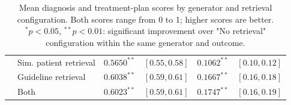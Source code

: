 \begin{table}[!b]
\begin{tabular*}{\textwidth}{@{\extracolsep{\fill}}lllclc@{}}
 & Sim. patient retrieval & $0.5650^{**}$ & {\scriptsize $[0.55, 0.58]$} & $0.1062^{**}$ & {\scriptsize $[0.10, 0.12]$} \\
 & Guideline retrieval & $\mathbf{0.6038}^{**}$ & {\scriptsize $[0.59, 0.61]$} & $0.1667^{**}$ & {\scriptsize $[0.16, 0.18]$} \\
 & Both & $0.6023^{**}$ & {\scriptsize $[0.59, 0.61]$} & $\mathbf{0.1747}^{**}$ & {\scriptsize $[0.16, 0.19]$} \\
\bottomrule
\end{tabular*}
\captionsetup{justification=raggedright,singlelinecheck=false}
\caption{Mean diagnosis and treatment-plan scores by generator and retrieval configuration. Both scores range from 0 to 1; higher scores are better. $^{*}p<0.05$, $^{**}p<0.01$: significant improvement over "No retrieval" configuration within the same generator and outcome.}
\label{tab:main-results}
\end{table}
